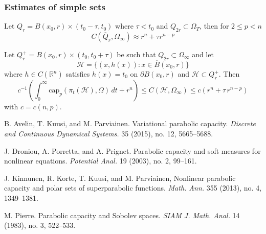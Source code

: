 \documentclass[10pt]{beamer}
\newcommand{\R}{\mathbb{R}}
\begin{document}
\begin{frame}
	\frametitle{Estimates of simple sets}
	\begin{theorem}
		Let $Q_r = B(x_0,r) \times (t_0-\tau, t_0)$ where $\tau < t_0$ and $Q_{2r} \subset \Omega_T$, then for $2 \leq p < n$
		\begin{equation} \nonumber \label{}
			C(\overline Q_r,\Omega_\infty) \approx r^n + \tau r^{n-p}
		\end{equation}
	\end{theorem}
	\pause
	\begin{theorem}
		Let $Q_r^+ = B(x_0,r) \times (t_0,t_0+\tau)$ be such that $Q_{2r} \subset \Omega_\infty$ and let
			\[ \mathcal{H} = \{ (x,h(x)): x \in \overline {B}(x_0,r) \} \]
			where $h \in C(\R^n)$ satisfies $h(x) = t_0$ on $\partial B(x_0,r)$ and $\mathcal{H} \subset Q_r^+$. Then
			\begin{equation*}
				c^{-1} \left(\int_{0}^\infty \text{cap}_p(\pi_t(\mathcal{H}), \Omega) \, dt+r^n \right) \leq C(\mathcal{H},\Omega_\infty) \leq c (r^n + \tau \, r^{n-p} )
			\end{equation*}
			with $c= c(n,p)$.
	\end{theorem}
\end{frame}


\begin{frame} %
	\begin{thebibliography}{HKM06}
		\footnotesize
		 B. Avelin, T. Kuusi, and M. Parviainen.
		\newblock Variational parabolic capacity.
		\newblock \emph{Discrete and Continuous Dynamical Systems.} 35 (2015), no. 12, 5665--5688.
		
		 J. Droniou, A. Porretta, and A. Prignet. 
		\newblock Parabolic capacity and soft measures for nonlinear equations. 
		\newblock \emph{Potential Anal.} 19 (2003), no. 2, 99--161.
		
		 J. Kinnunen, R. Korte, T. Kuusi, and M. Parviainen, 
		\newblock Nonlinear parabolic capacity and polar sets of superparabolic functions.
		\newblock \emph{Math. Ann.} 355 (2013), no. 4, 1349--1381.
		
		 M. Pierre. 
		\newblock Parabolic capacity and Sobolev spaces. 
		\newblock \emph{SIAM J. Math. Anal.} 14 (1983), no. 3, 522--533.
	\end{thebibliography}
\end{frame}
\end{document}

